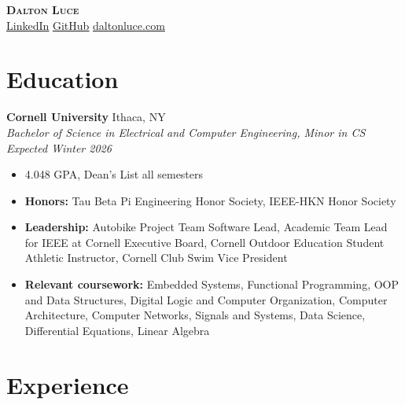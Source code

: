 \documentclass[letterpaper,10pt]{article}
\newcommand{\resumeEntry}[4]{
    \vspace{5pt}
    {\large \textbf{#1}}
    \hfill
    {\normalsize #2}
    \\
    \textit{#3} \hfill \textit{#4}
    \vspace{1pt}
}
\newcommand{\itemsBegin}{
    \begin{itemize}[leftmargin=0.2in, labelsep=0.05in, itemsep=0pt, parsep=1pt, topsep=0pt, partopsep=0pt]
    \small
}
\newcommand{\itemsEnd}{\end{itemize}}
\begin{document}
\textbf{\huge \scshape Dalton Luce} \\
\vspace{2pt}
\small
\addressConditional{}   %
\phoneConditional{}     %
\emailConditional{}     %
\href{https://www.linkedin.com/in/dalton-luce/}{\underline{LinkedIn}} %
\hspace{10pt}
\href{https://github.com/da-luce}{\underline{GitHub}}                 %
\hspace{10pt}
\href{https://daltonluce.com/}{\underline{daltonluce.com}}            %
\vspace{-5pt}

\section{Education}

    \resumeEntry{Cornell University}
        {Ithaca, NY}
        {Bachelor of Science in Electrical and Computer Engineering, Minor in CS}
        {Expected Winter 2026}

    \itemsBegin{}
        \item 4.048 GPA, Dean's List all semesters
        \item \textbf{Honors:} Tau Beta Pi Engineering Honor Society, IEEE-HKN Honor Society
        \item \textbf{Leadership:} Autobike Project Team Software Lead, Academic Team Lead for IEEE at Cornell Executive Board, Cornell Outdoor Education Student Athletic Instructor, Cornell Club Swim Vice President
        \item \textbf{Relevant coursework:} Embedded Systems, Functional Programming, OOP and Data Structures, Digital Logic and Computer Organization, Computer Architecture, Computer Networks, Signals and Systems, Data Science, Differential Equations, Linear Algebra
    \itemsEnd{}

\section{Experience}
\end{document}
